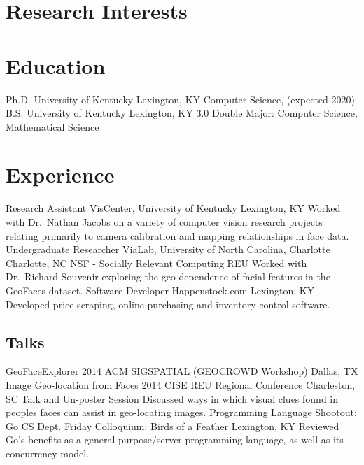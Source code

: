 \documentclass[10pt]{moderncv}
\begin{document}
\makecvtitle

\section{Research Interests}

\section{Education}
  {Ph.D.}
  {University of Kentucky}
  {Lexington, KY}
  {}
  {Computer Science, (expected 2020)}
  {B.S.}
  {University of Kentucky}
  {Lexington, KY}
  {3.0}
  {Double Major: Computer Science, Mathematical Science}

\section{Experience}
  {Research Assistant}
  {VisCenter, University of Kentucky}
  {Lexington, KY}
  {}
  {Worked with Dr.~Nathan Jacobs on a variety of computer vision
   research projects relating primarily to camera calibration and mapping
   relationships in face data.}
  {Undergraduate Researcher}
  {ViaLab, University of North Carolina, Charlotte}
  {Charlotte, NC}
  {NSF - Socially Relevant Computing REU}
  {Worked with Dr.~Richard Souvenir exploring the geo-dependence of facial features in the GeoFaces dataset.}
  {Software Developer}
  {Happenstock.com}
  {Lexington, KY}
  {}
  {Developed price scraping, online purchasing and inventory control software.}

\nocite{*}
\printbibliography[title={Publications}]

\subsection{Talks}
  {GeoFaceExplorer}
  {2014 ACM SIGSPATIAL (GEOCROWD Workshop)}
  {Dallas, TX}
  {}
  {}
  {Image Geo-location from Faces}
  {2014 CISE REU Regional Conference}
  {Charleston, SC}
  {Talk and Un-poster Session}
  {Discussed ways in which visual clues found in peoples faces can assist in geo-locating images.}
  {Programming Language Shootout: Go}
  {CS Dept. Friday Colloquium: Birds of a Feather}
  {Lexington, KY}
  {}
  {Reviewed Go's benefits as a general purpose/server programming language, as well as its concurrency model.}
\end{document}
